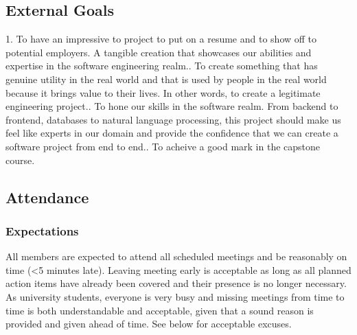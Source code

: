 \documentclass{article}
\begin{document}

\subsection*{External Goals}


\par{1. To have an impressive to project to put on a resume and to show off to potential employers. A tangible creation that showcases our abilities
and expertise in the software engineering realm.\newline{}. To create something that has genuine utility in the real world and that is used by people in the real world because it brings value to their lives.
In other words, to create a legitimate engineering project.\newline{}. To hone our skills in the software realm. From backend to frontend, databases to natural language processing, this project should make us feel like experts 
in our domain and provide the confidence that we can create a software project from end to end.\newline{}. To acheive a good mark in the capstone course.}

\subsection*{Attendance}

\subsubsection*{Expectations}


\par{All members are expected to attend all scheduled meetings and be reasonably on time (<5 minutes late). Leaving meeting early is acceptable as long
as all planned action items have already been covered and their presence is no longer necessary. As university students, everyone is very busy and missing
meetings from time to time is both understandable and acceptable, given that a sound reason is provided and given ahead of time. See below for acceptable excuses.}
\end{document}
